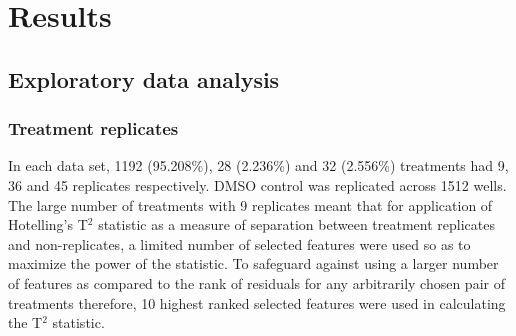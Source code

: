 \documentclass[11pt]{article}
\begin{document}
\clearpage
\section{Results}\label{results}
\subsection{Exploratory data analysis}\label{edaresults}

\subsubsection{Treatment replicates}
\par{In each data set, 1192 (95.208\%), 28 (2.236\%) and 32 (2.556\%) treatments had 9, 36  and 45 replicates respectively. DMSO control was replicated across 1512 wells.
The large number of treatments with 9 replicates meant that for application of Hotelling's T$^2$ statistic as a measure of separation between treatment replicates and non-replicates, a limited number of selected features were used so as to maximize the power of the statistic. To safeguard against using a larger number of features as compared to the rank of residuals for any arbitrarily chosen pair of treatments therefore, 10 highest ranked selected features were used in calculating the T$^2$ statistic.
}
\end{document}
